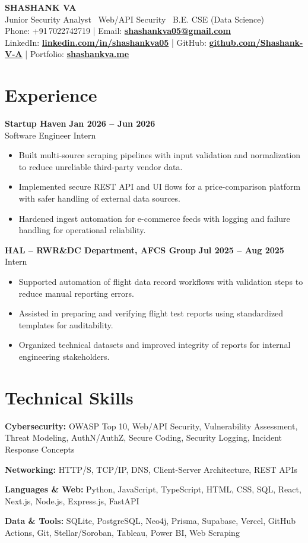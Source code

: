 \documentclass[9pt,letterpaper]{article}
\newcommand{\resumeSubheading}[4]{%
  \vspace{1pt}%
  \textbf{#1} \hfill {\bfseries #2}\\[2pt]
  {#3} \hfill {\color{muted}\small #4}\par\vspace{1pt}%
}
\newcommand{\resumeItem}{\item}
\newcommand{\skillLine}[2]{%
  \textbf{#1} #2\par\vspace{1pt}%
}
\newcommand{\resumelink}[2]{\href{#1}{\textbf{#2}}}
\begin{document}
\begin{center}
  {\fontsize{24}{28}\selectfont\bfseries\color{accent} SHASHANK VA}\\[2pt]
  {Junior Security Analyst \textbar\ Web/API Security \textbar\ B.E. CSE (Data Science)}\\[4pt]
  \small
  Phone: +91\,7022742719 \quad | \quad
  Email: \resumelink{mailto:shashankva05@gmail.com}{shashankva05@gmail.com}\\[2pt]
  LinkedIn: \resumelink{https://linkedin.com/in/shashankva05}{linkedin.com/in/shashankva05} \quad | \quad
  GitHub: \resumelink{https://github.com/Shashank-V-A}{github.com/Shashank-V-A} \quad | \quad
  Portfolio: \resumelink{http://shashankva.me/}{shashankva.me}
\end{center}
\vspace{1pt}

\section{Experience}

\resumeSubheading
  {Startup Haven}{Jan 2026 -- Jun 2026}
  {Software Engineer Intern}{}
\begin{itemize}[leftmargin=*, nosep, topsep=1pt, itemsep=0pt]
  \resumeItem{Built multi-source scraping pipelines with input validation and normalization to reduce unreliable third-party vendor data.}
  \resumeItem{Implemented secure REST API and UI flows for a price-comparison platform with safer handling of external data sources.}
  \resumeItem{Hardened ingest automation for e-commerce feeds with logging and failure handling for operational reliability.}
\end{itemize}

\resumeSubheading
  {HAL -- RWR\&DC Department, AFCS Group}{Jul 2025 -- Aug 2025}
  {Intern}{}
\begin{itemize}[leftmargin=*, nosep, topsep=1pt, itemsep=0pt]
  \resumeItem{Supported automation of flight data record workflows with validation steps to reduce manual reporting errors.}
  \resumeItem{Assisted in preparing and verifying flight test reports using standardized templates for auditability.}
  \resumeItem{Organized technical datasets and improved integrity of reports for internal engineering stakeholders.}
\end{itemize}

\section{Technical Skills}
\vspace{1pt}
\skillLine{Cybersecurity:}{OWASP Top 10, Web/API Security, Vulnerability Assessment, Threat Modeling, AuthN/AuthZ, Secure Coding, Security Logging, Incident Response Concepts}
\skillLine{Networking:}{HTTP/S, TCP/IP, DNS, Client-Server Architecture, REST APIs}
\skillLine{Languages \& Web:}{Python, JavaScript, TypeScript, HTML, CSS, SQL, React, Next.js, Node.js, Express.js, FastAPI}
\skillLine{Data \& Tools:}{SQLite, PostgreSQL, Neo4j, Prisma, Supabase, Vercel, GitHub Actions, Git, Stellar/Soroban, Tableau, Power BI, Web Scraping}
\end{document}

